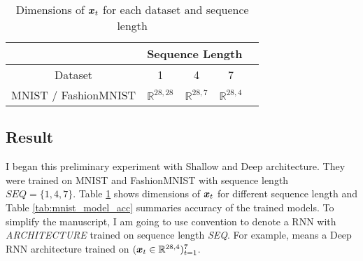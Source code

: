  
 
\renewcommand{\arraystretch}{1.5}
\begin{table}[h]
\centering
\begin{tabular}{l|l|l|l|l|}
\cline{2-4}
                                            & \multicolumn{3}{c|}{Sequence Length}                                                               \\ \hline
\multicolumn{1}{|c|}{Dataset}               & \multicolumn{1}{c|}{1} & \multicolumn{1}{c|}{4} & \multicolumn{1}{c|}{7}  \\ \hline
\multicolumn{1}{|l|}{MNIST / FashionMNIST} &        $ \mathbb{R}^{28,28}  $              &          $ \mathbb{R}^{28,7}  $               &         $ \mathbb{R}^{28,4}  $                            \\ \hline
\end{tabular}
\caption{Dimensions of $\patvector{x}_t$ for each dataset and sequence length}
\label{tab:seq-length}

\end{table}
\renewcommand{\arraystretch}{1}


\subsection{Result}
I began this preliminary experiment  with Shallow and Deep architecture. They were trained on MNIST and FashionMNIST with sequence length $ SEQ = \{1, 4, 7\}$. Table \ref{tab:seq-length} shows dimensions of $\patvector{x}_t$ for different sequence length and Table \ref{tab:mnist_model_acc} summaries accuracy of the trained models. To simplify the manuscript, I am going to use \textit{} convention to denote a RNN with \textit{ARCHITECTURE} trained on sequence length \textit{SEQ}. For example,  means a  Deep RNN architecture trained on $(\boldsymbol{x}_t \in \mathbb{R}^{28,4} )_{t=1}^{7}$.


